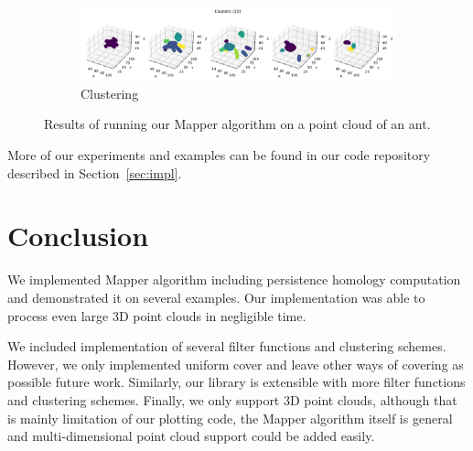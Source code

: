 \documentclass{article}
\begin{document}
\begin{figure}[ht]
\begin{subfigure}[c]{0.9\columnwidth}
        \centering
        \includegraphics[width=\textwidth]{ant-clusters}
        \caption{Clustering}
        \label{fig:ant-cluster}
    \end{subfigure}
    \caption{Results of running our Mapper algorithm on a point cloud of an ant.}
    \label{fig:ant}
\end{figure}

More of our experiments and examples can be found in our code repository described in Section~\ref{sec:impl}.

\section{Conclusion}\label{sec:concl}

We implemented Mapper algorithm including persistence homology computation and demonstrated it on several examples.
Our implementation was able to process even large 3D point clouds in negligible time.

We included implementation of several filter functions and clustering schemes.
However, we only implemented uniform cover and leave other ways of covering as
possible future work. Similarly, our library is extensible with more filter
functions and clustering schemes. Finally, we only support 3D point clouds,
although that is mainly limitation of our plotting code, the Mapper algorithm
itself is general and multi-dimensional point cloud support could be added
easily.



\end{document}
